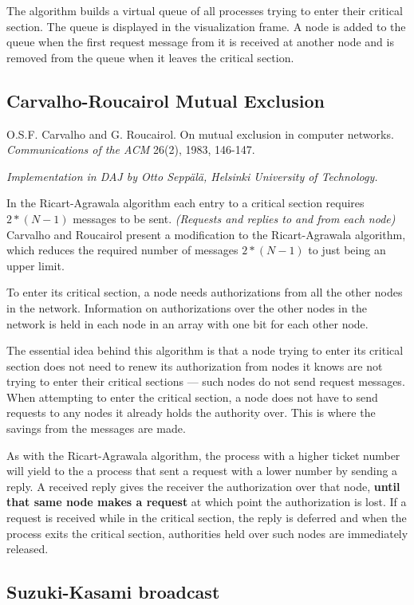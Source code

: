 \documentclass[11pt]{article}
\begin{document}
The algorithm builds a virtual queue of all processes trying to enter their
critical section.
The queue is displayed in the visualization frame.
A node is added to the queue when the first request message from it is received
at another node and is removed from the queue when it leaves the critical section.


\subsection{Carvalho-Roucairol Mutual Exclusion}

O.S.F. Carvalho and G. Roucairol.
On mutual exclusion in computer networks.
\emph{Communications of the ACM} 26(2), 1983, 146-147.

\emph{Implementation in DAJ by Otto Sepp\"al\"a, Helsinki University of Technology.}

In the Ricart-Agrawala algorithm each entry to a critical section requires
$2*(N-1)$ messages to be sent. \emph{(Requests and replies to and from each node)}
Carvalho and Roucairol present a modification to the Ricart-Agrawala algorithm,
which reduces the required number of messages $2*(N-1)$ to just being an upper limit.

To enter its critical section, a node needs authorizations from all the other
nodes in the network. Information on authorizations over the
other nodes in the network is held in each node in an array
with one bit for each other node.

The essential idea behind this algorithm is that a node
trying to enter its critical section does not need to renew its authorization
from nodes it knows are not trying to enter their critical sections --- such nodes
do not send request messages. When attempting to enter the critical section,
a node does not have to send requests to any nodes it already holds the
authority over. This is where the savings from the messages are made.
 
As with the Ricart-Agrawala algorithm, the process with a higher ticket number
will yield to the a process that sent a request with a lower number by sending
a reply. A received reply gives the receiver the authorization over that node,
{\bf until that same node makes a request} at which point the authorization is lost.
If a request is received while in the critical section, the reply is deferred
and when the process exits the critical section, authorities held over such
nodes are immediately released.

\subsection{Suzuki-Kasami broadcast}
\end{document}
